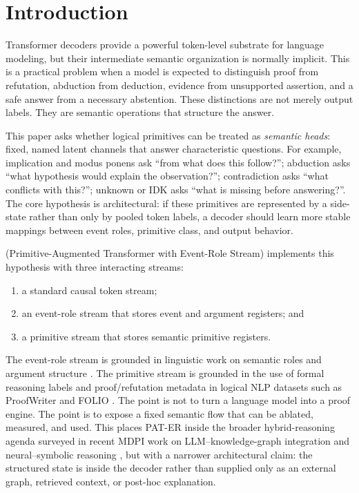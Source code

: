 \section{Introduction}
\label{sec:introduction}

Transformer decoders \citep{vaswani2017attention,brown2020language} provide a
powerful token-level substrate for language modeling, but their intermediate
semantic organization is normally implicit. This is a practical problem when a
model is expected to distinguish proof from refutation, abduction from
deduction, evidence from unsupported assertion, and a safe answer from a
necessary abstention. These distinctions are not merely output labels. They are
semantic operations that structure the answer.

This paper asks whether logical primitives can be treated as \emph{semantic
heads}: fixed, named latent channels that answer characteristic questions. For
example, implication and modus ponens ask ``from what does this follow?'';
abduction asks ``what hypothesis would explain the observation?''; contradiction
asks ``what conflicts with this?''; unknown or IDK asks ``what is missing before
answering?''. The core hypothesis is architectural: if these primitives are
represented by a side-state rather than only by pooled token labels, a decoder
should learn more stable mappings between event roles, primitive class, and
output behavior.

\PATER{} (Primitive-Augmented Transformer with Event-Role Stream) implements
this hypothesis with three interacting streams:

\begin{enumerate}
  \item a standard causal token stream;
  \item an event-role stream that stores event and argument registers; and
  \item a primitive stream that stores semantic primitive registers.
\end{enumerate}

The event-role stream is grounded in linguistic work on semantic roles and
argument structure \citep{dowty1991proto,palmer2005propbank,baker1998framenet}.
The primitive stream is grounded in the use of formal reasoning labels and
proof/refutation metadata in logical NLP datasets such as ProofWriter
\citep{tafjord2021proofwriter} and FOLIO \citep{han2024folio}. The point is not
to turn a language model into a proof engine. The point is to expose a fixed
semantic flow that can be ablated, measured, and used.
This places PAT-ER inside the broader hybrid-reasoning agenda surveyed in recent
MDPI work on LLM--knowledge-graph integration and neural--symbolic reasoning
\citep{dehal2025kgllm,liang2025neurosymbolic}, but with a narrower architectural
claim: the structured state is inside the decoder rather than supplied only as
an external graph, retrieved context, or post-hoc explanation.

